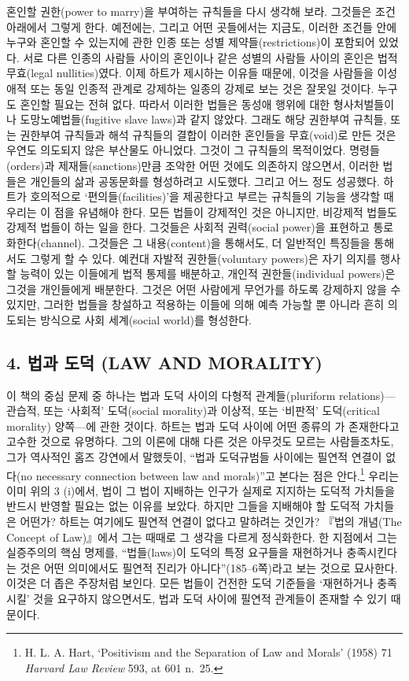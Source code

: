 혼인할 권한(power to marry)을 부여하는 규칙들을 다시 생각해 보라.
그것들은 조건 아래에서 그렇게 한다. 예전에는, 그리고 어떤 곳들에서는
지금도, 이러한 조건들 안에 누구와 혼인할 수 있는지에 관한 인종 또는 성별
제약들(restrictions)이 포함되어 있었다. 서로 다른 인종의 사람들 사이의
혼인이나 같은 성별의 사람들 사이의 혼인은 법적 무효(legal
nullities)였다. 이제 하트가 제시하는 이유들 때문에, 이것을 사람들을
이성애적 또는 동일 인종적 관계로 강제하는 일종의 강제로 보는 것은 잘못일
것이다. 누구도 혼인할 필요는 전혀 없다. 따라서 이러한 법들은 동성애
행위에 대한 형사처벌들이나 도망노예법들(fugitive slave laws)과 같지
않았다. 그래도 해당 권한부여 규칙들, 또는 권한부여 규칙들과 해석
규칙들의 결합이 이러한 혼인들을 무효(void)로 만든 것은 우연도 의도되지
않은 부산물도 아니었다. 그것이 그 규칙들의 목적이었다. 명령들(orders)과
제재들(sanctions)만큼 조악한 어떤 것에도 의존하지 않으면서, 이러한
법들은 개인들의 삶과 공동문화를 형성하려고 시도했다. 그리고 어느 정도
성공했다. 하트가 호의적으로 ‘편의들(facilities)’을 제공한다고 부르는
규칙들의 기능을 생각할 때 우리는 이 점을 유념해야 한다. 모든 법들이
강제적인 것은 아니지만, 비강제적 법들도 강제적 법들이 하는 일을 한다.
그것들은 사회적 권력(social power)을 표현하고 통로화한다(channel).
그것들은 그 내용(content)을 통해서도, 더 일반적인 특징들을 통해서도
그렇게 할 수 있다. 예컨대 자발적 권한들(voluntary powers)은 자기 의지를
행사할 능력이 있는 이들에게 법적 통제를 배분하고, 개인적
권한들(individual powers)은 그것을 개인들에게 배분한다. 그것은 어떤
사람에게 무언가를 하도록 강제하지 않을 수 있지만, 그러한 법들을 창설하고
적용하는 이들에 의해 예측 가능할 뿐 아니라 흔히 의도되는 방식으로 사회
세계(social world)를 형성한다.

\subsection{4. 법과 도덕 (LAW AND
MORALITY)}\label{uxbc95uxacfc-uxb3c4uxb355-law-and-morality}

이 책의 중심 문제 중 하나는 법과 도덕 사이의 다형적 관계들(pluriform
relations)---관습적, 또는 ‘사회적’ 도덕(social morality)과 이상적, 또는
‘비판적’ 도덕(critical morality) 양쪽---에 관한 것이다. 하트는 법과 도덕
사이에 어떤 종류의 가 존재한다고 고수한 것으로
유명하다. 그의 이론에 대해 다른 것은 아무것도 모르는 사람들조차도, 그가
역사적인 홈즈 강연에서 말했듯이, “법과 도덕규범들 사이에는 필연적
연결이 없다(no necessary connection between law and morals)”고 본다는
점은 안다.\footnote{H. L. A. Hart, `Positivism and the Separation of Law
  and Morals' (1958) 71 \emph{Harvard Law Review} 593, at 601 n.~25.}
우리는 이미 위의 3 (i)에서, 법이 그 법이 지배하는 인구가 실제로 지지하는
도덕적 가치들을 반드시 반영할 필요는 없는 이유를 보았다. 하지만 그들을
 지배해야 할 도덕적 가치들은 어떤가? 하트는 여기에도 필연적
연결이 없다고 말하려는 것인가? 『법의 개념(The Concept of Law)』에서
그는 때때로 그 생각을 다르게 정식화한다. 한 지점에서 그는 실증주의의
핵심 명제를, “법들(laws)이 도덕의 특정 요구들을 재현하거나 충족시킨다는
것은 어떤 의미에서도 필연적 진리가 아니다”(185--6쪽)라고 보는 것으로
묘사한다. 이것은 더 좁은 주장처럼 보인다. 모든 법들이 건전한 도덕
기준들을 ‘재현하거나 충족시킬’ 것을 요구하지 않으면서도, 법과 도덕
사이에 필연적 관계들이 존재할 수 있기 때문이다.

